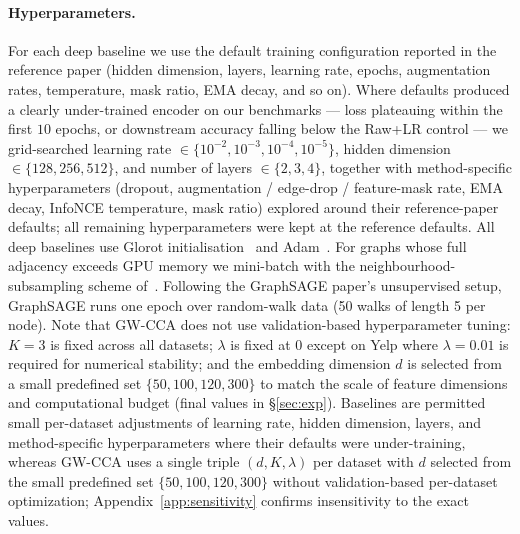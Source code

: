 \documentclass{article}
\begin{document}
\paragraph{Hyperparameters.}
For each deep baseline we use the default training configuration reported
in the reference paper (hidden dimension, layers, learning rate, epochs,
augmentation rates, temperature, mask ratio, EMA decay, and so on). Where
defaults produced a clearly under-trained encoder on our benchmarks ---
loss plateauing within the first $10$ epochs, or downstream accuracy
falling below the Raw+LR control --- we grid-searched learning rate
$\in \{10^{-2}, 10^{-3}, 10^{-4}, 10^{-5}\}$, hidden dimension
$\in \{128, 256, 512\}$, and number of layers $\in \{2, 3, 4\}$, together
with method-specific hyperparameters (dropout, augmentation /
edge-drop / feature-mask rate, EMA decay, InfoNCE temperature, mask
ratio) explored around their reference-paper defaults; all remaining
hyperparameters were kept at the reference defaults. All deep baselines
use Glorot initialisation~\citep{glorot2010understanding} and
Adam~\citep{kingma2014adam}. For graphs whose full adjacency exceeds GPU
memory we mini-batch with the neighbourhood-subsampling scheme
of~\citet{hamilton2017inductive}. Following the GraphSAGE paper's
unsupervised setup, GraphSAGE runs one epoch over random-walk data (50
walks of length 5 per node).
Note that GW-CCA does not use validation-based
hyperparameter tuning:
$K = 3$ is fixed across all datasets; $\lambda$ is fixed at $0$ except on
Yelp where $\lambda = 0.01$ is required for numerical stability; and the
embedding dimension $d$ is selected from a small
predefined set $\{50, 100, 120, 300\}$ to match the scale of feature
dimensions and computational budget (final values in \S\ref{sec:exp}).
Baselines are permitted small per-dataset adjustments of learning rate,
hidden dimension, layers, and method-specific hyperparameters where
their defaults were under-training, whereas GW-CCA uses a single triple
$(d, K, \lambda)$ per dataset with $d$ selected from the small
predefined set $\{50, 100, 120, 300\}$ without
validation-based per-dataset optimization; Appendix~\ref{app:sensitivity}
confirms insensitivity to the exact values.
\end{document}
